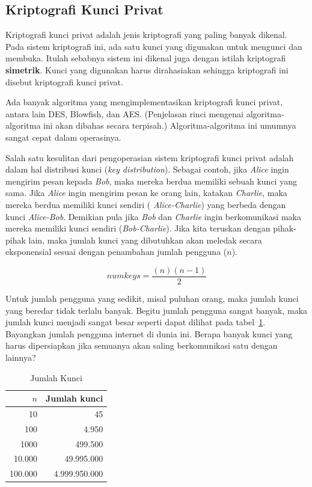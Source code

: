 \subsection{Kriptografi Kunci Privat}
Kriptografi kunci privat adalah jenis kriptografi yang paling banyak dikenal.
Pada sistem kriptografi ini, ada satu kunci yang digunakan untuk mengunci dan
membuka. Itulah sebabnya sistem ini dikenal juga dengan istilah kriptografi
{\bf simetrik}. Kunci yang digunakan harus dirahasiakan sehingga kriptografi
ini disebut kriptografi kunci privat.

Ada banyak algoritma yang mengimplementasikan kriptografi kunci privat, antara
lain DES, Blowfish, dan AES. (Penjelasan rinci mengenai algoritma-algoritma ini
akan dibahas secara terpisah.) Algoritma-algoritma ini umumnya sangat cepat
dalam operasinya.

Salah satu kesulitan dari pengoperasian sistem kriptografi kunci privat adalah
dalam hal distribusi kunci ({\em key distribution}). Sebagai contoh, jika {\em
Alice} ingin mengirim pesan kepada {\em Bob}, maka mereka berdua memiliki
sebuah kunci yang sama. Jika {\em Alice} ingin mengirim pesan ke orang lain,
katakan {\em Charlie}, maka mereka berdua memiliki kunci sendiri ({\em
Alice-Charlie}) yang berbeda dengan kunci {\em Alice-Bob}. Demikian pula jika
{\em Bob} dan {\em Charlie} ingin berkomunikasi maka mereka memiliki kunci
sendiri ({\em Bob-Charlie}). Jika kita teruskan dengan pihak-pihak lain, maka
jumlah kunci yang dibutuhkan akan meledak secara eksponensial sesuai dengan
penambahan jumlah pengguna ($n$).

\begin{equation}
   numkeys = \frac{(n) (n-1)}{2}
\end{equation}

Untuk jumlah pengguna yang sedikit, misal puluhan orang, maka jumlah kunci yang
beredar tidak terlalu banyak. Begitu jumlah pengguna sangat banyak, maka jumlah
kunci menjadi sangat besar seperti dapat dilihat pada
tabel~\ref{tbl:jumlahkunci}. Bayangkan jumlah pengguna internet di dunia ini.
Berapa banyak kunci yang harus dipersiapkan jika semuanya akan saling
berkomunikasi satu dengan lainnya?

\begin{table}
   \centering
   \caption{Jumlah Kunci}
   \label{tbl:jumlahkunci}
\begin{tabular}{ r r }
   $n$ & Jumlah kunci \\
   \hline
  10 & 45 \\
  100 & 4.950 \\
  1000 & 499.500 \\
  10.000 & 49.995.000 \\
  100.000 & 4.999.950.000 \\
\end{tabular}
\end{table}

